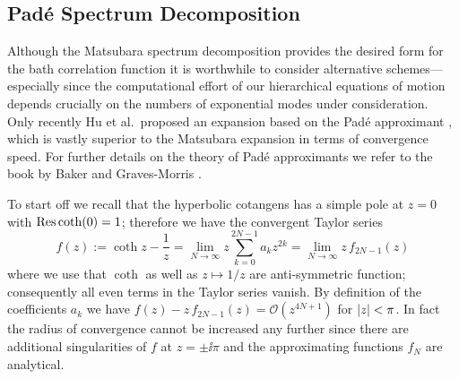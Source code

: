 \subsection{Padé Spectrum Decomposition}
\label{sub:num.expansion.pade}

Although the Matsubara spectrum decomposition provides the desired form for the bath correlation function it is worthwhile to consider alternative schemes---especially since the computational effort of our hierarchical equations of motion depends crucially on the numbers of exponential modes under consideration.
Only recently Hu et al.\ proposed an expansion based on the Padé approximant \cite{HuXuYa10_pade,Hu11_pade}, which is vastly superior to the Matsubara expansion in terms of convergence speed.
For further details on the theory of Padé approximants we refer to the book by Baker and Graves-Morris \cite{BaGr96_pade}.

To start off we recall that the hyperbolic cotangens has a simple pole at $z=0$ with $\operatorname{Res}\coth(0) = 1$; therefore we have the convergent Taylor series
\begin{equation}
  f(z) := \coth z - \frac{1}{z} = \lim_{N\to\infty} z \sum_{k=0}^{2N-1} a_k z^{2k} = \lim_{N\to\infty} z \, f_{2N-1}(z)
  \label{eq:num.coth_expansion}
\end{equation}
where we use that $\coth$ as well as $z \mapsto 1/z$ are anti-symmetric function; consequently all even terms in the Taylor series vanish.
By definition of the coefficients $a_k$ we have $f(z) - z \, f_{2N-1}(z) = \mathcal{O}(z^{4N + 1})$ for $\left\vert z \right\vert < \pi$.
In fact the radius of convergence cannot be increased any further since there are additional singularities of $f$ at $z = \pm\ii\pi$ and the approximating functions $f_N$ are analytical.

